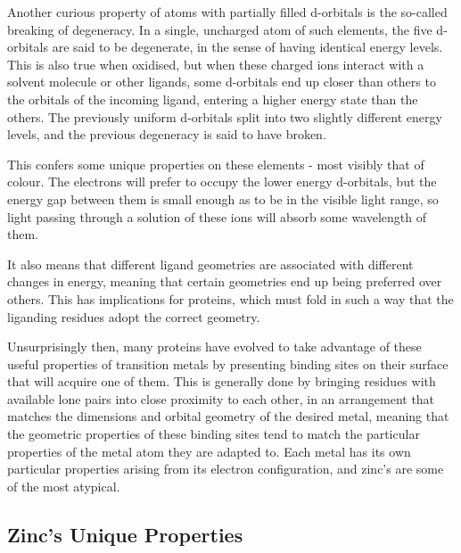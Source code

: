 Another curious property of atoms with partially filled d-orbitals is the so-called breaking of degeneracy. In a single, uncharged atom of such elements, the five d-orbitals are said to be degenerate, in the sense of having identical energy levels. This is also true when oxidised, but when these charged ions interact with a solvent molecule or other ligands, some d-orbitals end up closer than others to the orbitals of the incoming ligand, entering a higher energy state than the others. The previously uniform d-orbitals split into two slightly different energy levels, and the previous degeneracy is said to have broken.

This confers some unique properties on these elements - most visibly that of colour. The electrons will prefer to occupy the lower energy d-orbitals, but the energy gap between them is small enough as to be in the visible light range, so light passing through a solution of these ions will absorb some wavelength of them.

It also means that different ligand geometries are associated with different changes in energy, meaning that certain geometries end up being preferred over others. This has implications for proteins, which must fold in such a way that the liganding residues adopt the correct geometry.

Unsurprisingly then, many proteins have evolved to take advantage of these useful properties of transition metals by presenting binding sites on their surface that will acquire one of them. This is generally done by bringing residues with available lone pairs into close proximity to each other, in an arrangement that matches the dimensions and orbital geometry of the desired metal, meaning that the geometric properties of these binding sites tend to match the particular properties of the metal atom they are adapted to. Each metal has its own particular properties arising from its electron configuration, and zinc's are some of the most atypical.

\subsection{Zinc's Unique Properties}

